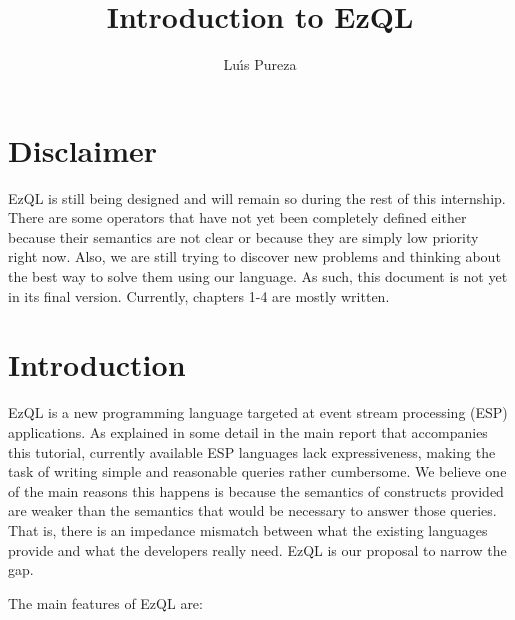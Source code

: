 \documentclass{report}
\begin{document}
\title{Introduction to EzQL}
\author{Lu\'{\i}s Pureza}

\maketitle

\chapter*{Disclaimer}

EzQL is still being designed and will remain so during the rest of
this internship. There are some operators that have not yet been
completely defined either because their semantics are not clear or
because they are simply low priority right now. Also, we are still
trying to discover new problems and thinking about the best way to
solve them using our language. As such, this document is not yet in
its final version. Currently, chapters 1-4 are mostly written.

\tableofcontents

\addtolength{\parskip}{\baselineskip}

\chapter{Introduction}
\label{chap:introduction}
EzQL is a new programming language targeted at event stream processing
(ESP) applications. As explained in some detail in the main report
that accompanies this tutorial, currently available ESP languages lack
expressiveness, making the task of writing simple and reasonable
queries rather cumbersome. We believe one of the main reasons this
happens is because the semantics of constructs provided are weaker
than the semantics that would be necessary to answer those
queries. That is, there is an impedance mismatch between what the
existing languages provide and what the developers really need. EzQL
is our proposal to narrow the gap.

The main features of EzQL are:
\end{document}
